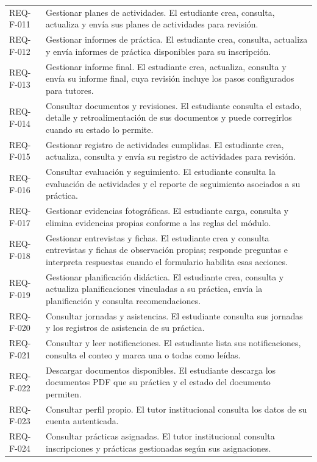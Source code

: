 \documentclass[11pt,a4paper]{article}
\begin{document}
{\begin{longtable}{@{}P{2.5cm}P{12.6cm}@{}}
REQ-F-011 & Gestionar planes de actividades. El estudiante crea, consulta, actualiza y envía sus planes de actividades para revisión.\\
REQ-F-012 & Gestionar informes de práctica. El estudiante crea, consulta, actualiza y envía informes de práctica disponibles para su inscripción.\\
REQ-F-013 & Gestionar informe final. El estudiante crea, actualiza, consulta y envía su informe final, cuya revisión incluye los pasos configurados para tutores.\\
REQ-F-014 & Consultar documentos y revisiones. El estudiante consulta el estado, detalle y retroalimentación de sus documentos y puede corregirlos cuando su estado lo permite.\\
REQ-F-015 & Gestionar registro de actividades cumplidas. El estudiante crea, actualiza, consulta y envía su registro de actividades para revisión.\\
REQ-F-016 & Consultar evaluación y seguimiento. El estudiante consulta la evaluación de actividades y el reporte de seguimiento asociados a su práctica.\\
REQ-F-017 & Gestionar evidencias fotográficas. El estudiante carga, consulta y elimina evidencias propias conforme a las reglas del módulo.\\
REQ-F-018 & Gestionar entrevistas y fichas. El estudiante crea y consulta entrevistas y fichas de observación propias; responde preguntas e interpreta respuestas cuando el formulario habilita esas acciones.\\
REQ-F-019 & Gestionar planificación didáctica. El estudiante crea, consulta y actualiza planificaciones vinculadas a su práctica, envía la planificación y consulta recomendaciones.\\
REQ-F-020 & Consultar jornadas y asistencias. El estudiante consulta sus jornadas y los registros de asistencia de su práctica.\\
REQ-F-021 & Consultar y leer notificaciones. El estudiante lista sus notificaciones, consulta el conteo y marca una o todas como leídas.\\
REQ-F-022 & Descargar documentos disponibles. El estudiante descarga los documentos PDF que su práctica y el estado del documento permiten.\\
REQ-F-023 & Consultar perfil propio. El tutor institucional consulta los datos de su cuenta autenticada.\\
REQ-F-024 & Consultar prácticas asignadas. El tutor institucional consulta inscripciones y prácticas gestionadas según sus asignaciones.\\

\end{longtable}}
\end{document}
